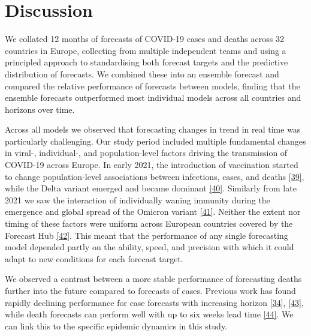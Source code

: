 \documentclass[
]{article}
\begin{document}
\hypertarget{discussion}{%
\section{Discussion}\label{discussion}}

We collated 12 months of forecasts of COVID-19 cases and deaths across 32 countries in Europe, collecting from multiple independent teams and using a principled approach to standardising both forecast targets and the predictive distribution of forecasts. We combined these into an ensemble forecast and compared the relative performance of forecasts between models, finding that the ensemble forecasts outperformed most individual models across all countries and horizons over time.

Across all models we observed that forecasting changes in trend in real time was particularly challenging. Our study period included multiple fundamental changes in viral-, individual-, and population-level factors driving the transmission of COVID-19 across Europe. In early 2021, the introduction of vaccination started to change population-level associations between infections, cases, and deaths \protect\hyperlink{ref-europeancentrefordiseasepreventionandcontrolInterimGuidanceBenefits2021}{{[}39{]}}, while the Delta variant emerged and became dominant \protect\hyperlink{ref-europeancentrefordiseasepreventionandcontrolThreatAssessmentBrief2021}{{[}40{]}}. Similarly from late 2021 we saw the interaction of individually waning immunity during the emergence and global spread of the Omicron variant \protect\hyperlink{ref-europeancentrefordiseasepreventionandcontrolAssessmentFurtherSpread2022}{{[}41{]}}. Neither the extent nor timing of these factors were uniform across European countries covered by the Forecast Hub \protect\hyperlink{ref-europeancentrefordiseasepreventionandcontrolOverviewImplementationCOVID192021}{{[}42{]}}. This meant that the performance of any single forecasting model depended partly on the ability, speed, and precision with which it could adapt to new conditions for each forecast target.

We observed a contrast between a more stable performance of forecasting deaths further into the future compared to forecasts of cases. Previous work has found rapidly declining performance for case forecasts with increasing horizon \protect\hyperlink{ref-cramerEvaluationIndividualEnsemble2021}{{[}34{]}}, \protect\hyperlink{ref-castroTurningPointEnd2020}{{[}43{]}}, while death forecasts can perform well with up to six weeks lead time \protect\hyperlink{ref-friedmanPredictivePerformanceInternational2021}{{[}44{]}}. We can link this to the specific epidemic dynamics in this study.
\end{document}
